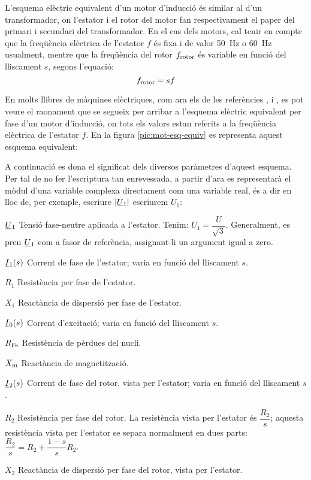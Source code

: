 L'esquema elèctric equivalent d'un motor d'inducció és similar al d'un transformador, on l'estator i el rotor del motor fan respectivament el paper del primari i  secundari del transformador. En el cas dels motors, cal tenir en compte que la freqüència elèctrica de l'estator $f$ és fixa i de valor \qty{50}{Hz} o \qty{60}{Hz} usualment, mentre que la freqüència del rotor $f_\mathrm{rotor}$ és variable en funció del lliscament $s$, segons l'equació:
\begin{equation}
    f_\mathrm{rotor} = s f
\end{equation}

En molts llibres de màquines elèctriques, com ara els de les referències \cite{CHA}, \cite{FIT} i \cite{JFM}, es pot veure el raonament que se segueix per arribar a l'esquema elèctric equivalent per fase d'un motor d'inducció, on tots els valors estan referits a la freqüència elèctrica de l'estator $f$. En la figura \vref{pic:mot-esq-equiv} es representa aquest esquema equivalent:

\begin{center}
    
    \label{pic:mot-esq-equiv}
\end{center}

A continuació es dona el significat dels diversos paràmetres d'aquest esquema. Per tal de no fer l'escriptura tan enrevessada, a partir d'ara es representarà el mòdul d'una variable complexa  directament com una variable real, és a dir en lloc de, per exemple, escriure $|\cmplx{U}_1|$ escriurem $U_1$:

\begin{list}{}
   {\setlength{\labelwidth}{10mm} \setlength{\leftmargin}{15mm} \setlength{\labelsep}{5mm}}
   \item[$\cmplx{U}_1$] Tensió fase-neutre aplicada a l'estator. Tenim: $U_1 = \dfrac{U}{\sqrt{3}}$. Generalment,   es pren $\cmplx{U}_1$ com a fasor de referència, assignant-li un argument igual a zero.
   \item[$\cmplx{I}_1(s)$] Corrent de fase de l'estator; varia en funció del lliscament $s$.
   \item[$R_1$] Resistència per fase de l'estator.
   \item[$X_1$] Reactància de dispersió per fase de l'estator.
   \item[$\cmplx{I}_0(s)$] Corrent d'excitació; varia en funció del lliscament $s$.
   \item[$R_\mathrm{Fe}$] Resistència de pèrdues del nucli.
   \item[$X_\mathrm{m}$] Reactància de magnetització.
   \item[$\cmplx{I}_2(s)$] Corrent de fase del rotor, vista per l'estator; varia en funció del lliscament $s$.
   \item[$R_2$] Resistència per fase del rotor. La resistència vista per l'estator és $\dfrac{R_2}{s}$; aquesta resistència vista per l'estator se separa normalment en dues parts: $\dfrac{R_2}{s} = R_2 + \dfrac{1-s}{s} R_2$.
   \item[$X_2$] Reactància de dispersió per fase del rotor, vista per l'estator.
\end{list}

